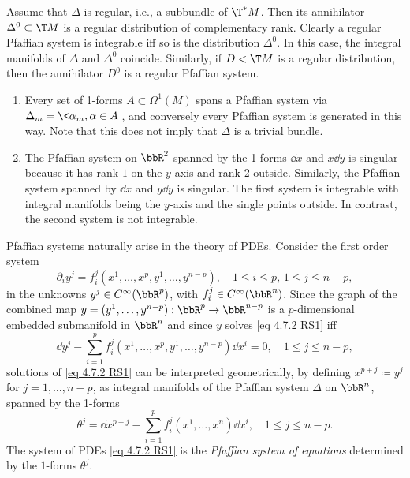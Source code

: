 \begin{rem}
    Assume that $\Delta$ is regular, i.e., a subbundle of $\T^\ast M$. Then its annihilator $\Delta^0\subset \T M$ is a regular distribution of complementary rank. Clearly a regular Pfaffian system is integrable iff so is the distribution $\Delta^0$. In this case, the integral manifolds of $\Delta$ and $\Delta^0$ coincide. Similarly, if $D< \T M$ is a regular distribution, then the annihilator $D^0$ is a regular Pfaffian system.
\end{rem}

\begin{example}
    \begin{enumerate}
        \item Every set of 1-forms $A\subset \Omega^1(M)$ spans a Pfaffian system via $\Delta_m=\<\alpha_m,\alpha\in A\>$, and conversely every Pfaffian system is generated in this way. Note that this does not imply that $\Delta$ is a trivial bundle.
        \item The Pfaffian system on $\bbR^2$ spanned by the 1-forms $\dd x$ and $x\dd y$ is singular because it has rank $1$ on the $y$-axis and rank 2 outside. Similarly, the Pfaffian system spanned by $\dd x$ and $y\dd y$ is singular. The first system is integrable with integral manifolds being the $y$-axis and the single points outside. In contrast, the second system is not integrable.
    \end{enumerate}
\end{example}

Pfaffian systems naturally arise in the theory of PDEs. Consider the first order system
\[\partial_i y^j=f_i^j(x^1,\ldots,x^p,y^1,\ldots,y^{n-p}),\quad 1\leq i\leq p,\,1\leq j\leq n-p,\label{eq 4.7.2 RS1}\]
in the unknowns $y^j\in C^\infty(\bbR^p)$, with $f_i^j\in C^\infty(\bbR^n)$. Since the graph of the combined map $y=(y^1,\ldots,y^{n-p}):\bbR^p\to \bbR^{n-p}$ is a $p$-dimensional embedded submanifold in $\bbR^n$ and since $y$ solves \eqref{eq 4.7.2 RS1} iff
\[\dd y^j-\sum_{i=1}^p f_i^j(x^1,\ldots,x^p,y^1,\ldots,y^{n-p})\dd x^i=0,\quad 1\leq j\leq n-p,\]
solutions of \eqref{eq 4.7.2 RS1} can be interpreted geometrically, by defining $x^{p+j}\coloneqq y^j$ for $j=1,\ldots,n-p$, as integral manifolds of the Pfaffian system $\Delta$ on $\bbR^n$, spanned by the 1-forms
\[\theta^j=\dd x^{p+j}-\sum_{i=1}^p f_i^j(x^1,\ldots,x^n)\dd x^i,\quad 1\leq j\leq n-p.\]
The system of PDEs \eqref{eq 4.7.2 RS1} is the \emph{Pfaffian system of equations} determined by the $1$-forms $\theta^j$.

